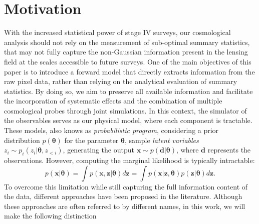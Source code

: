 \documentclass{aa}
\begin{document}
\section{Motivation}
With the increased statistical power of stage IV surveys, our cosmological analysis should not rely on the measurement of sub-optimal summary statistics, that may not fully capture the non-Gaussian information present in the lensing field at the scales accessible to future surveys. One of the main objectives of this paper is to introduce a forward model that directly extracts information from the raw pixel data, rather than relying on the analytical evaluation of summary statistics. By doing so, we aim to preserve all available information and facilitate the incorporation of systematic effects and the combination of multiple cosmological probes through joint simulations.
In this context, the simulator of the observables serves as our physical model, where each component is tractable. These models, also knows as \textit{probabilistic program}, considering a prior distribution $p(\bm{\theta})$ for the parameter $\bm{\theta}$, sample \textit{latent variables} $z_i \sim p_i(z_i|\bm \theta, z_{<i})$, generating the output $\bm x \sim p(\bm d|\bm \theta)$, where $\bm{d}$ represents the observations. However, computing the marginal likelihood is typically intractable:
\begin{equation}
    p(\bm{x}|\bm{\theta})=\int p(\bm{x},\bm{z}|\bm{\theta}) d\bm{z}=\int p(\bm{x}|\bm{z},\bm{\theta})p(\bm{z}|\bm{\theta}) d\bm{z}.
\end{equation}
To overcome this limitation while still capturing the full information content of the data, different approaches have been proposed in the literature. Although these approaches are often referred to by different names, in this work, we will make the following distinction
\end{document}
